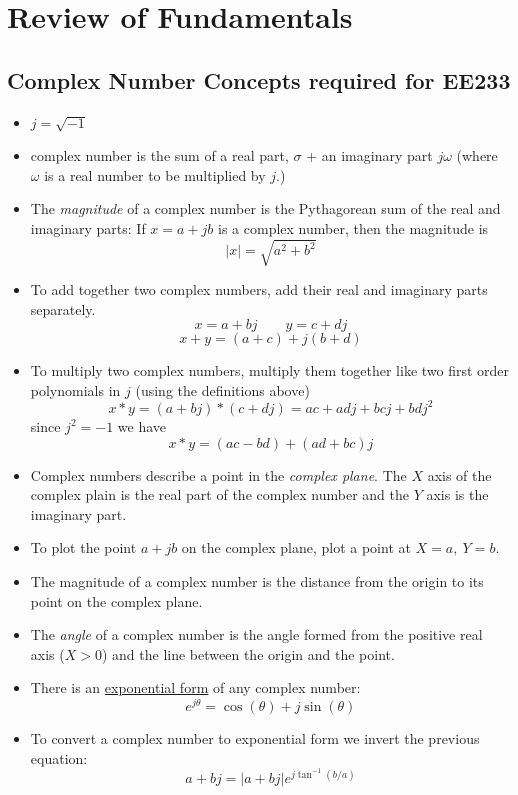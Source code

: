 \chapter{Review of Fundamentals}

\section{Complex Number Concepts required for EE233}\label{cnconcepts}
\begin{itemize}
  \item $j = \sqrt{-1}$
  \item complex number is the sum of a real part, $\sigma$ + an imaginary part $j\omega$ (where $\omega$ is a real number to be multiplied by $j$.)
  \item   The {\it magnitude} of a complex number is the Pythagorean sum of the real and imaginary parts:
  If $x= a+jb$ is a complex number, then the magnitude is
  \[
  |x| = \sqrt{a^2+b^2}
  \]
  \item To add together two complex numbers, add their real and imaginary parts separately.
  \[
  x = a+bj \qquad y = c+dj
  \]
  \[
  x + y = (a+c) + j(b+d)
  \]
  \item To multiply two complex numbers, multiply them together like two first order polynomials in $j$ (using the definitions above)
  \[
  x*y = (a+bj)*(c+dj) = ac+adj + bcj+bdj^2
  \]
  since $j^2=-1$ we have
  \[
  x*y = (ac-bd)+(ad+bc)j
  \]

  \item Complex numbers describe a point in the {\it complex plane}.  The $X$ axis of the complex plain is the real part of the complex number and the $Y$ axis is the imaginary part.

  \item To plot the point $a+jb$ on the complex plane, plot a point at $X = a, \: Y = b$.

  \item The magnitude of a complex number is the distance from the origin to its point on the complex plane.

  \item The {\it angle} of a complex number is the angle formed from the positive real axis ($X>0$) and the line between the origin and the point.

  \item There is an \href{http://en.wikipedia.org/wiki/Euler\%27s_formula}{exponential form} of any complex number:
  \[
  e^{j\theta} = \cos(\theta) + j\sin(\theta)
  \]
  \item To convert a complex number to exponential form we invert the previous equation:
  \[
  a+bj = |a+bj| e^{j\tan^{-1}(b/a)}
  \]


\end{itemize}
